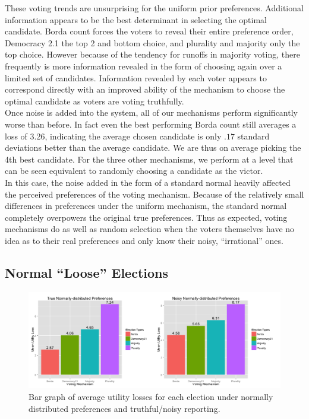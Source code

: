 \documentclass[11pt]{scrartcl}
\begin{document}
These voting trends are unsurprising for the uniform prior preferences. Additional information appears to be the best determinant in selecting the optimal candidate. Borda count forces the voters to reveal their entire preference order, Democracy 2.1 the top 2 and bottom choice, and plurality and majority only the top choice. However because of the tendency for runoffs in majority voting, there frequently is more information revealed in the form of choosing again over a limited set of candidates. Information revealed by each voter appears to correspond directly with an improved ability of the mechanism to choose the optimal candidate as voters are voting truthfully.\\

Once noise is added into the system, all of our mechanisms perform significantly worse than before. In fact even the best performing Borda count still averages a loss of 3.26, indicating the average chosen candidate is only $.17$ standard deviations better than the average candidate. We are thus on average picking the 4th best candidate. For the three other mechanisms, we perform at a level that can be seen equivalent to randomly choosing a candidate as the victor.\\

In this case, the noise added in the form of a standard normal heavily affected the perceived preferences of the voting mechanism. Because of the relatively small differences in preferences under the uniform mechanism, the standard normal completely overpowers the original true preferences. Thus as expected, voting mechanisms do as well as random selection when the voters themselves have no idea as to their real preferences and only know their noisy, ``irrational'' ones.


\subsection{Normal ``Loose'' Elections}
\begin{figure}[H]\center
\includegraphics[scale=0.38]{normal.png}
\caption{Bar graph of average utility losses for each election under normally distributed preferences and truthful/noisy reporting.}
\end{figure}
\end{document}
